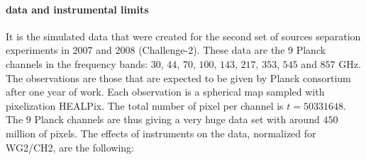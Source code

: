 \paragraph*{data and instrumental limits}

It is the simulated data that were created for the second set of sources separation experiments in 2007 and 2008 (Challenge-2). These data are the 9 Planck channels in the frequency bands: 
$30$, $44$, $70$, $100$, $143$, $217$, $353$, $545$ and $857$ GHz. The observations are those that are expected to be given by Planck consortium after one year of work. Each observation is 
a spherical map sampled with pixelization HEALPix. The total number of pixel per channel is $t = 50331648$. The $9$ Planck channels are thus giving a very huge data set with around $450$ million of pixels. 
The effects of instruments on the data, normalized for WG2/CH2, are the following:
